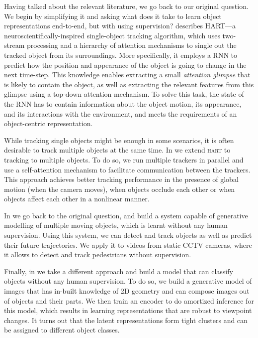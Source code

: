  	Having talked about the relevant literature, we go back to our original question. 
 	We begin by simplifying it and asking what does it take to learn object representations end-to-end, but with using supervision?
	 describes \textsc{HART}---a neuroscientifically-inspired single-object tracking algorithm, which uses two-stream processing and a hierarchy of attention mechanisms to single out the tracked object from its surroundings. 
	More specifically, it employs a \gls{RNN} to predict how the position and appearance of the object is going to change in the next time-step. 
	This knowledge enables extracting a small \textit{attention glimpse} that is likely to contain the object, as well as extracting the relevant features from this glimpse using a top-down attention mechanism.
	To solve this task, the state of the \gls{RNN} has to contain information about the object motion, its appearance, and its interactions with the environment, and meets the requirements of an object-centric representation.
	
 	While tracking single objects might be enough in some scenarios, it is often desirable to track multiple objects at the same time. In  we extend \textsc{hart} to tracking to multiple objects.
 	To do so, we run multiple trackers in parallel and use a self-attention mechanism to facilitate communication between the trackers. This approach achieves better tracking performance in the presence of global motion (\!\eg when the camera moves), when objects occlude each other or when objects affect each other in a nonlinear manner. 
 	
 	In  we go back to the original question, and build a system capable of generative modelling of multiple moving objects, which is learnt without any human supervision. 
 	Using this system, we can detect and track objects as well as predict their future trajectories. 
 	We apply it to videos from static CCTV cameras, where it allows to detect and track pedestrians without supervision.
 	
 	Finally, in  we take a different approach and build a model that can classify objects without any human supervision. To do so, we build a generative model of images that has in-built knowledge of 2D geometry and can compose images out of objects and their parts. We then train an encoder to do amortized inference for this model, which results in learning representations that are robust to viewpoint changes. It turns out that the latent representations form tight clusters and can be assigned to different object classes.
 	
